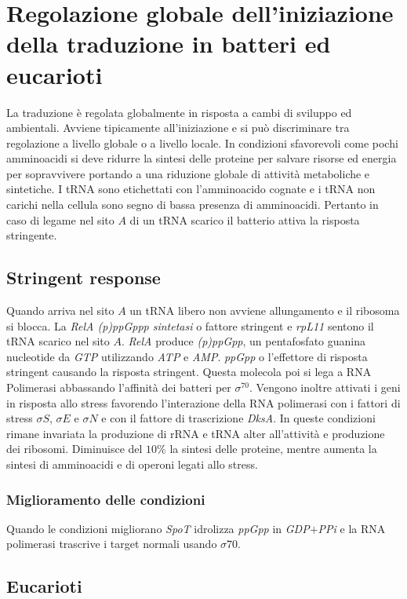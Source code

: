 \section{Regolazione globale dell'iniziazione della traduzione in batteri ed eucarioti}
La traduzione \`e regolata globalmente in risposta a cambi di sviluppo ed ambientali. Avviene tipicamente all'iniziazione e si pu\`o discriminare tra regolazione a livello globale o 
a livello locale. In condizioni sfavorevoli come pochi amminoacidi si deve ridurre la sintesi delle proteine per salvare risorse ed energia per sopravvivere portando
a una riduzione globale di attivit\`a metaboliche e sintetiche. I tRNA sono etichettati con l'amminoacido cognate e i tRNA non carichi nella cellula sono segno di bassa presenza di 
amminoacidi. Pertanto in caso di legame nel sito $A$ di un tRNA scarico il batterio attiva la risposta stringente. 
\subsection{Stringent response}
Quando arriva nel sito $A$ un tRNA libero non avviene allungamento e il ribosoma si blocca. La \emph{RelA (p)ppGppp sintetasi} o fattore stringent e \emph{rpL11} sentono il 
tRNA scarico nel sito $A$. \emph{RelA} produce \emph{(p)ppGpp}, un pentafosfato guanina nucleotide da \emph{GTP} utilizzando \emph{ATP} e \emph{AMP}. \emph{ppGpp} o l'effettore di 
risposta stringent causando la risposta stringent. Questa molecola poi si lega a RNA Polimerasi abbassando l'affinit\`a dei batteri per $\sigma^{70}$. Vengono inoltre attivati i 
geni in risposta allo stress favorendo l'interazione della RNA polimerasi con i fattori di stress \emph{$\sigma S$}, \emph{$\sigma E$} e \emph{$\sigma N$} e con il fattore di trascrizione \emph{DksA}. 
In queste condizioni rimane invariata la produzione di rRNA e tRNA alter all'attivit\`a e produzione dei ribosomi. Diminuisce del $10\%$ la sintesi delle proteine, mentre aumenta la sintesi di amminoacidi
e di operoni legati allo stress.
\subsubsection{Miglioramento delle condizioni}
Quando le condizioni migliorano \emph{SpoT} idrolizza \emph{ppGpp} in \emph{GDP$+$PPi} e la RNA polimerasi trascrive i target normali usando \emph{$\sigma70$}. 
\subsection{Eucarioti}
